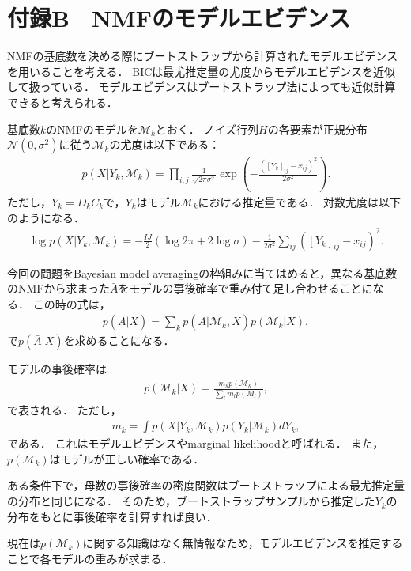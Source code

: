 \chapter{付録B　NMFのモデルエビデンス}
NMFの基底数を決める際にブートストラップから計算されたモデルエビデンスを用いることを考える．
BICは最尤推定量の尤度からモデルエビデンスを近似して扱っている．
モデルエビデンスはブートストラップ法によっても近似計算できると考えられる．

基底数$k$のNMFのモデルを$\mathcal{M}_k$とおく．
ノイズ行列$H$の各要素が正規分布$\mathcal{N} (0, \sigma^2)$に従う$\mathcal{M}_k$の尤度は以下である：
\begin{align}
	p(X | Y_k, \mathcal{M}_k) = \prod_{i,j} \frac{1}{\sqrt{2 \pi \sigma^2}} \exp(-\frac{([Y_k]_{ij} - x_{ij})^2}{2 \sigma^2}).
	\label{eq:likelihood}
\end{align}
ただし，$Y_k = D_k C_k$で，$Y_k$はモデル$\mathcal{M}_k$における推定量である．
対数尤度は以下のようになる．
\begin{align}
	\log p(X | Y_k, \mathcal{M}_k) = - \frac{IJ}{2} (\log 2\pi + 2 \log \sigma) - \frac{1}{2 \sigma^2} \sum_{ij}([Y_k]_{ij} - x_{ij})^2.
\end{align}

今回の問題をBayesian model averagingの枠組みに当てはめると，異なる基底数のNMFから求まった$\bar{A}$をモデルの事後確率で重み付て足し合わせることになる．
この時の式は，
\begin{align}
	p(\bar{A}|X) = \sum_k p(\bar{A}|\mathcal{M}_k, X) p(\mathcal{M}_k | X),
\end{align}
で$p(\bar{A}|X)$を求めることになる．

モデルの事後確率は
\begin{align}
	p(\mathcal{M}_k|X) = \frac{m_k p(\mathcal{M}_k)}{\sum_l m_l p(M_l)},
\end{align}
で表される．
ただし，
\begin{align}
	m_k = \int p(X | Y_k, \mathcal{M}_k) p(Y_k| \mathcal{M}_k) dY_k,
	\label{eq:evidence}
\end{align}
である．
これはモデルエビデンスやmarginal likelihoodと呼ばれる．
また，$p(\mathcal{M}_k)$はモデルが正しい確率である．

ある条件下で，母数の事後確率の密度関数はブートストラップによる最尤推定量の分布と同じになる．
そのため，ブートストラップサンプルから推定した$Y_k$の分布をもとに事後確率を計算すれば良い．

現在は$p(\mathcal{M}_k)$に関する知識はなく無情報なため，モデルエビデンスを推定することで各モデルの重みが求まる．

